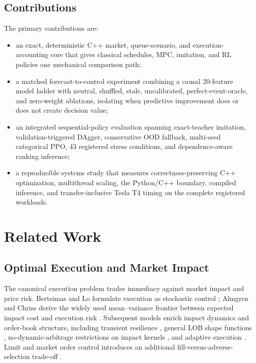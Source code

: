 \documentclass[journal,10pt]{IEEEtran}
\newcommand{\1}{\mathbf{1}}
\begin{document}
\subsection{Contributions}
The primary contributions are:
\begin{itemize}[leftmargin=*]
    \item an exact, deterministic C++ market, queue-scenario, and execution-accounting core that gives classical schedules, MPC, imitation, and RL policies one mechanical comparison path;
    \item a matched forecast-to-control experiment combining a causal 20-feature model ladder with neutral, shuffled, stale, uncalibrated, perfect-event-oracle, and zero-weight ablations, isolating when predictive improvement does or does not create decision value;
    \item an integrated sequential-policy evaluation spanning exact-teacher imitation, validation-triggered DAgger, conservative OOD fallback, multi-seed categorical PPO, 43 registered stress conditions, and dependence-aware ranking inference;
    \item a reproducible systems study that measures correctness-preserving C++ optimization, multithread scaling, the Python/C++ boundary, compiled inference, and transfer-inclusive Tesla T4 timing on the complete registered workloads.
\end{itemize}

\section{Related Work}
\label{sec:related}
\subsection{Optimal Execution and Market Impact}
The canonical execution problem trades immediacy against market impact and price risk. Bertsimas and Lo formulate execution as stochastic control \cite{BertsimasLo1998}; Almgren and Chriss derive the widely used mean--variance frontier between expected impact cost and execution risk \cite{AlmgrenChriss2001}. Subsequent models enrich impact dynamics and order-book structure, including transient resilience \cite{ObizhaevaWang2013}, general LOB shape functions \cite{AlfonsiFruthSchied2010}, no-dynamic-arbitrage restrictions on impact kernels \cite{Gatheral2010}, and adaptive execution \cite{LorenzAlmgren2011}. Limit and market order control introduces an additional fill-versus-adverse-selection trade-off \cite{CarteaJaimungal2015,GueantLehalleFernandezTapia2012}.
\end{document}
